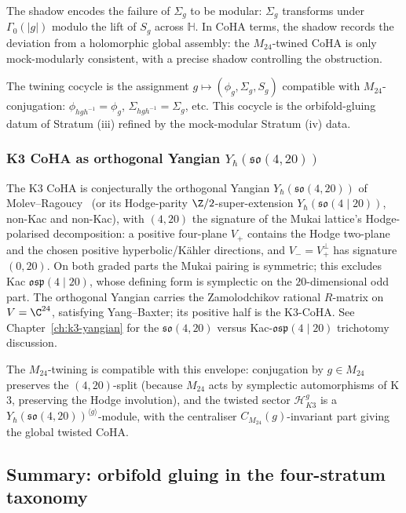 The shadow encodes the failure of $\Sigma_g$ to be modular: $\Sigma_g$ transforms under $\Gamma_0(|g|)$ modulo the lift of $S_g$ across $\mathbb{H}$. In CoHA terms, the shadow records the deviation from a holomorphic global assembly: the $M_{24}$-twined CoHA is only mock-modularly consistent, with a precise shadow controlling the obstruction.

The twining cocycle is the assignment $g \mapsto (\phi_g, \Sigma_g, S_g)$ compatible with $M_{24}$-conjugation: $\phi_{hgh^{-1}} = \phi_g$, $\Sigma_{hgh^{-1}} = \Sigma_g$, etc. This cocycle is the orbifold-gluing datum of Stratum (iii) refined by the mock-modular Stratum (iv) data.

\subsubsection{K3 CoHA as orthogonal Yangian \texorpdfstring{$Y_\hbar(\mathfrak{so}(4, 20))$}{Y-so(4,20)}}
\label{gl:subsec:k3-super-yangian}

The K$3$ CoHA is conjecturally the orthogonal Yangian
$Y_\hbar(\mathfrak{so}(4, 20))$ of Molev--Ragoucy~\cite{MolevRagoucy2008}
\textup{(}or its Hodge-parity $\Z/2$-super-extension
$Y_\hbar(\mathfrak{so}(4 \mid 20))$, non-Kac and
non-Kac\textup{)}, with $(4,20)$ the signature of the Mukai lattice's
Hodge-polarised decomposition: a positive four-plane \(V_+\) contains
the Hodge two-plane and the chosen positive hyperbolic/K\"ahler
directions, and \(V_- = V_+^\perp\) has signature \((0,20)\). On both graded parts the Mukai pairing is
symmetric; this excludes Kac $\mathfrak{osp}(4 \mid 20)$, whose
defining form is symplectic on the $20$-dimensional odd part. The
orthogonal Yangian carries the Zamolodchikov rational $R$-matrix on
$V = \C^{24}$, satisfying Yang--Baxter; its positive half is the
K$3$-CoHA. See Chapter~\ref{ch:k3-yangian} for the
$\mathfrak{so}(4, 20)$ versus Kac-$\mathfrak{osp}(4 \mid 20)$
trichotomy discussion.

The $M_{24}$-twining is compatible with this envelope: conjugation
by $g \in M_{24}$ preserves the $(4, 20)$-split (because $M_{24}$
acts by symplectic automorphisms of K$3$, preserving the Hodge
involution), and the twisted sector $\mathcal{H}_{K3}^g$ is a
$Y_\hbar(\mathfrak{so}(4, 20))^{\langle g \rangle}$-module, with the
centraliser $C_{M_{24}}(g)$-invariant part giving the global twisted
CoHA.

\subsection{Summary: orbifold gluing in the four-stratum taxonomy}
\label{sec:orbifold-summary}

